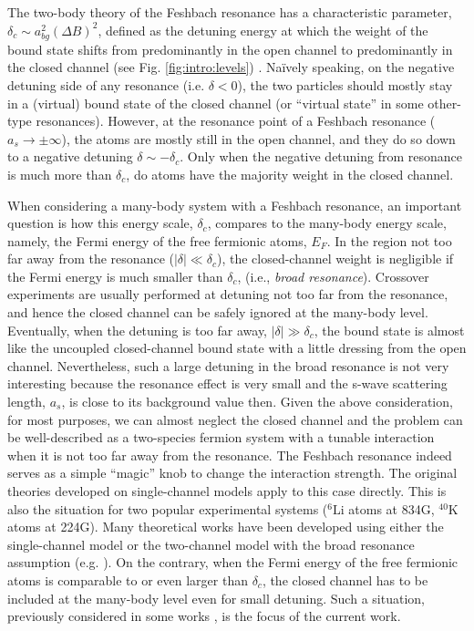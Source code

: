 \documentclass[reprint,pra]{revtex4-1}
\providecommand{\abs}[1]{\ensuremath{\left\lvert{#1}\right\rvert}}
\begin{document}
  The two-body theory of the Feshbach resonance has a characteristic  parameter, $\delta_c\sim{}a_{bg}^2(\Delta{B})^2$, defined as  the detuning energy at which the weight of the bound state shifts from predominantly in the open channel to predominantly in the closed channel (see Fig. \ref{fig:intro:levels}) \cite{Leggett}.  Na\"{i}vely speaking, on the negative detuning side of any resonance (i.e. $\delta<0$), the two particles should mostly stay  in a (virtual) bound state of the closed channel (or ``virtual state'' in some other-type resonances).  However, at the resonance point  of a Feshbach resonance ($a_s\to\pm\infty$), the atoms are mostly still in the open channel, and they do so down to a negative detuning $\delta\sim-\delta_c$. Only when the negative detuning from resonance is much more  than $\delta_c$, do atoms have the majority weight in the closed channel.    
  
  When considering a many-body system with a Feshbach resonance, an important question is how this energy scale, $\delta_c$, compares to the  many-body energy scale, namely, the Fermi energy of the free fermionic atoms, $E_F$. In the region not too far away from the resonance ($\abs{\delta}\ll\delta_{c}$), the closed-channel weight is negligible if the Fermi energy is much smaller than $\delta_c$, (i.e., \emph{broad resonance}).  Crossover experiments are usually performed at detuning not too far from the resonance, and hence the closed channel can be safely ignored at the many-body level. Eventually, when the detuning is too far away, $\abs{\delta}\gg\delta_{c}$, the bound state is almost like the    uncoupled closed-channel bound state with a little dressing from the open channel.  
  Nevertheless, such a large detuning in the broad resonance is not very interesting because the  resonance effect is very small and the s-wave scattering length, $a_s$, is close to its background  value then.  
 Given the above consideration, for most purposes, we can almost neglect the closed channel  and the problem can be well-described as a two-species fermion system with a tunable interaction when it is not too far away from the resonance.  The Feshbach resonance indeed serves as a simple ``magic'' knob to change the interaction strength.  The original  theories developed on  single-channel models  apply to this case directly.  This is also the situation for two  popular experimental systems (${}^{6}\text{Li}$ atoms at 834G, $^{40}\text{K}$ atoms at 224G).   Many theoretical works have been developed using either the single-channel model or  the two-channel model with the broad resonance assumption (e.g. \cite{Holland01,HoUniversal,Fuchs04}). On the contrary, when the Fermi energy of the free fermionic atoms is  comparable to or even larger than $\delta_c$, the closed channel has to be included at the many-body level even for small detuning. Such a situation, previously considered in some works \cite{JacksonNarrow,GurarieNarrow}, is the focus of the current work.
  
\end{document}
